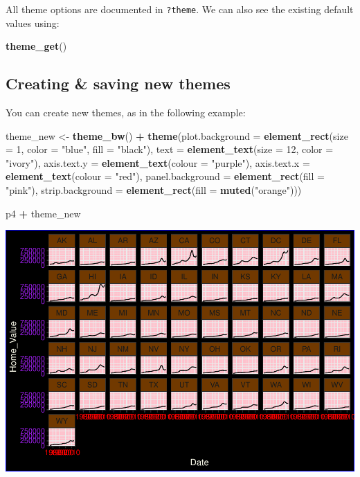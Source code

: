 \documentclass[
]{book}
\newenvironment{Shaded}{\begin{snugshade}}{\end{snugshade}}
\newcommand{\DataTypeTok}[1]{\textcolor[rgb]{0.13,0.29,0.53}{#1}}
\newcommand{\DecValTok}[1]{\textcolor[rgb]{0.00,0.00,0.81}{#1}}
\newcommand{\KeywordTok}[1]{\textcolor[rgb]{0.13,0.29,0.53}{\textbf{#1}}}
\newcommand{\NormalTok}[1]{#1}
\newcommand{\OperatorTok}[1]{\textcolor[rgb]{0.81,0.36,0.00}{\textbf{#1}}}
\newcommand{\StringTok}[1]{\textcolor[rgb]{0.31,0.60,0.02}{#1}}
\begin{document}
All theme options are documented in \texttt{?theme}. We can also see the existing default values using:

\begin{Shaded}
\begin{Highlighting}[]
\KeywordTok{theme\_get}\NormalTok{()}
\end{Highlighting}
\end{Shaded}

\hypertarget{creating-saving-new-themes}{%
\subsection{Creating \& saving new themes}\label{creating-saving-new-themes}}

You can create new themes, as in the following example:

\begin{Shaded}
\begin{Highlighting}[]
\NormalTok{theme\_new \textless{}{-}}\StringTok{ }\KeywordTok{theme\_bw}\NormalTok{() }\OperatorTok{+}
\StringTok{  }\KeywordTok{theme}\NormalTok{(}\DataTypeTok{plot.background =} \KeywordTok{element\_rect}\NormalTok{(}\DataTypeTok{size =} \DecValTok{1}\NormalTok{, }\DataTypeTok{color =} \StringTok{"blue"}\NormalTok{, }\DataTypeTok{fill =} \StringTok{"black"}\NormalTok{),}
        \DataTypeTok{text =} \KeywordTok{element\_text}\NormalTok{(}\DataTypeTok{size =} \DecValTok{12}\NormalTok{, }\DataTypeTok{color =} \StringTok{"ivory"}\NormalTok{),}
        \DataTypeTok{axis.text.y =} \KeywordTok{element\_text}\NormalTok{(}\DataTypeTok{colour =} \StringTok{"purple"}\NormalTok{),}
        \DataTypeTok{axis.text.x =} \KeywordTok{element\_text}\NormalTok{(}\DataTypeTok{colour =} \StringTok{"red"}\NormalTok{),}
        \DataTypeTok{panel.background =} \KeywordTok{element\_rect}\NormalTok{(}\DataTypeTok{fill =} \StringTok{"pink"}\NormalTok{),}
        \DataTypeTok{strip.background =} \KeywordTok{element\_rect}\NormalTok{(}\DataTypeTok{fill =} \KeywordTok{muted}\NormalTok{(}\StringTok{"orange"}\NormalTok{)))}

\NormalTok{p4 }\OperatorTok{+}\StringTok{ }\NormalTok{theme\_new}
\end{Highlighting}
\end{Shaded}

\includegraphics{R/Rgraphics/figures/unnamed-chunk-214-1.pdf}
\end{document}

